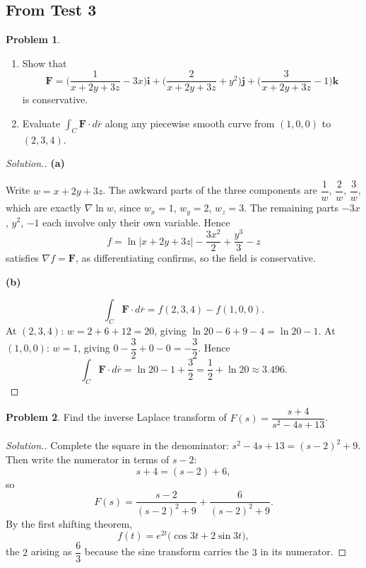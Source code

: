 \documentclass[11pt,a4paper]{article}
\theoremstyle{definition}
\newtheorem{problemx}{Problem}[subsection]
\newenvironment{problem}{\begin{problemx}}{\end{problemx}}
\newenvironment{solution}
  {\renewcommand{\qedsymbol}{}\begin{proof}[\textit{Solution}.]}
  {\end{proof}}
\newcommand{\subhead}[1]{%
  \par\medskip\noindent\textbf{#1}\par\nobreak\smallskip}
\begin{document}
\subsection{From Test 3}

\begin{problem}
\begin{enumerate}
\item[(a)] Show that
$$\textbf{F} = \Big(\frac{1}{x+2y+3z}-3x\Big)\textbf{i}
+ \Big(\frac{2}{x+2y+3z}+y^2\Big)\textbf{j}
+ \Big(\frac{3}{x+2y+3z}-1\Big)\textbf{k}$$
is conservative.
\item[(b)] Evaluate $\int_C\textbf{F}\cdot d\overline{r}$ along any piecewise
smooth curve from $(1,0,0)$ to $(2,3,4)$.
\end{enumerate}
\end{problem}
\begin{solution}
\subhead{(a)}
Write $w = x+2y+3z$. The awkward parts of the three components are
$\dfrac1w$, $\dfrac2w$, $\dfrac3w$, which are exactly
$\nabla\ln w$, since $w_x = 1$, $w_y = 2$, $w_z = 3$. The remaining parts
$-3x$, $y^2$, $-1$ each involve only their own variable. Hence
$$f = \ln\left|x+2y+3z\right| - \frac{3x^2}{2} + \frac{y^3}{3} - z$$
satisfies $\nabla f = \textbf{F}$, as differentiating confirms, so the field is
conservative.

\subhead{(b)}
$$\int_C\textbf{F}\cdot d\overline{r} = f(2,3,4)-f(1,0,0).$$
At $(2,3,4)$: $w = 2+6+12 = 20$, giving
$\ln 20 - 6 + 9 - 4 = \ln 20 - 1$.
At $(1,0,0)$: $w=1$, giving $0 - \dfrac32 + 0 - 0 = -\dfrac32$. Hence
$$\int_C\textbf{F}\cdot d\overline{r} = \ln 20 - 1 + \frac32
= \frac12 + \ln 20 \approx 3.496 .$$
\end{solution}

\begin{problem}
Find the inverse Laplace transform of
$F(s) = \dfrac{s+4}{s^2-4s+13}$.
\end{problem}
\begin{solution}
Complete the square in the denominator:
$s^2-4s+13 = (s-2)^2+9$. Then write the numerator in terms of $s-2$:
$$s+4 = (s-2)+6 ,$$
so
$$F(s) = \frac{s-2}{(s-2)^2+9} + \frac{6}{(s-2)^2+9}.$$
By the first shifting theorem,
$$f(t) = e^{2t}\Big(\cos 3t + 2\sin 3t\Big),$$
the $2$ arising as $\dfrac63$ because the sine transform carries the $3$ in its
numerator.
\end{solution}
\end{document}
